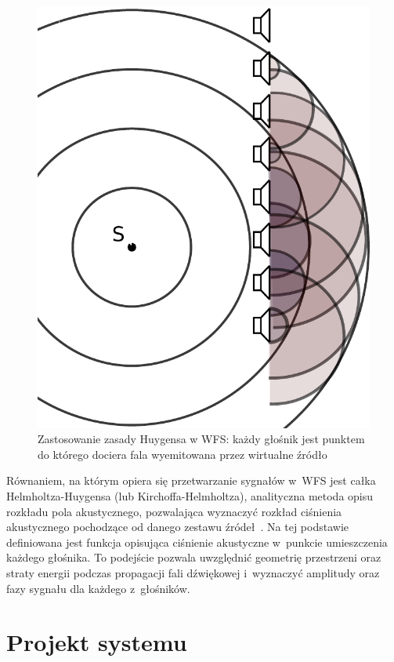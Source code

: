 \documentclass[10pt, a4paper]{article}
\let\Oldsection\section
\renewcommand{\section}{\FloatBarrier\Oldsection}
\begin{document}
\begin{figure}[!tbh]
  \centering
  \includegraphics[scale=.3]{vecgraphics/WFS_idea.pdf}
  \caption{Zastosowanie zasady Huygensa w WFS: każdy głośnik jest punktem do
  którego dociera fala wyemitowana przez wirtualne źródło}
  \label{r:Huygens}
\end{figure}

Równaniem, na którym opiera się przetwarzanie sygnałów w~WFS jest całka Helmholtza-Huygensa
(lub Kirchoffa-Helmholtza), analityczna metoda opisu rozkładu pola akustycznego,
pozwalająca wyznaczyć rozkład ciśnienia akustycznego pochodzące od danego zestawu
źródeł~\cite{snaka}. Na tej podstawie definiowana jest funkcja opisująca ciśnienie akustyczne 
w~punkcie umieszczenia każdego głośnika. To podejście pozwala uwzględnić geometrię
przestrzeni oraz straty energii podczas propagacji fali dźwiękowej i~wyznaczyć
amplitudy oraz fazy sygnału dla każdego z~głośników. 

\section{Projekt systemu}
\end{document}
